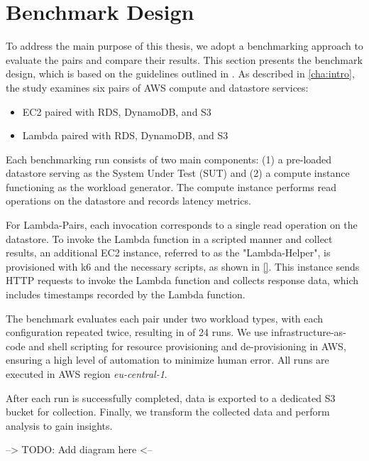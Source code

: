 \section{Benchmark Design}
\label{cha:approach}

To address the main purpose of this thesis, we adopt a benchmarking approach to evaluate the pairs and compare their results. This section presents the benchmark design, which is based on the guidelines outlined in \cite{}. As described in \cref{cha:intro}, the study examines six pairs of AWS compute and datastore services:

\begin{itemize}
	\item EC2 paired with RDS, DynamoDB, and S3
	\item Lambda paired with RDS, DynamoDB, and S3
\end{itemize}

Each benchmarking run consists of two main components: (1) a pre-loaded datastore serving as the System Under Test (SUT) and (2) a compute instance functioning as the workload generator. The compute instance performs read operations on the datastore and records latency metrics.

For Lambda-Pairs, each invocation corresponds to a single read operation on the datastore. To invoke the Lambda function in a scripted manner and collect results, an additional EC2 instance, referred to as the "Lambda-Helper", is provisioned with k6 and the necessary scripts, as shown in \ref{}. This instance sends HTTP requests to invoke the Lambda function and collects response data, which includes timestamps recorded by the Lambda function.

The benchmark evaluates each pair under two workload types, with each configuration repeated twice, resulting in of 24 runs. We use infrastructure-as-code and shell scripting for resource provisioning and de-provisioning in AWS, ensuring a high level of automation to minimize human error. All runs are executed in AWS region \textit{eu-central-1}.

After each run is successfully completed, data is exported to a dedicated S3 bucket for collection. Finally, we transform the collected data and perform analysis to gain insights.

--> TODO: Add diagram here <--
